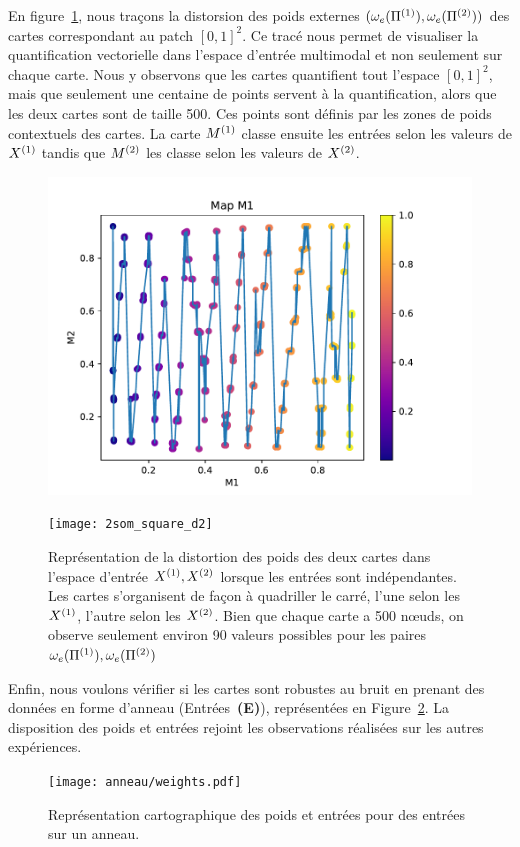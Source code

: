 \documentclass[../main]{subfiles}
\begin{document}
En figure~\ref{fig:2som_p_d}, nous traçons la distorsion des poids externes $(\omega_e(\Pi^{({1})}), \omega_e(\Pi^{({2})}))$ des cartes correspondant au patch $[0,1]^2$. Ce tracé nous permet de visualiser la quantification vectorielle dans l'espace d'entrée multimodal et non seulement sur chaque carte. 
Nous y observons que les cartes quantifient tout l'espace $[0,1]^2$, mais que seulement une centaine de points servent à la quantification, alors que les deux cartes sont de taille 500. Ces points sont définis par les zones de poids contextuels des cartes. La carte $M^{({1})}$ classe ensuite les entrées selon les valeurs de $X^{({1})}$ tandis que $M^{({2})}$ les classe selon les valeurs de $X^{({2})}$. 
\begin{figure}[t]
	\begin{minipage}{0.48\textwidth}
		\includegraphics[width=\textwidth]{2som_square_d}
	\end{minipage}
	\begin{minipage}{0.48\textwidth}
		\texttt{[image: 2som\_square\_d2]}
	\end{minipage}
	\caption{Représentation de la distortion des poids des deux cartes dans l'espace d'entrée $X^{({1})}, X^{({2})}$ lorsque les entrées sont indépendantes. Les cartes s'organisent de façon à quadriller le carré, l'une selon les $X^{({1})}$, l'autre selon les $X^{({2})}$. Bien que chaque carte a 500 n\oe{}uds, on observe seulement environ 90 valeurs possibles pour les paires $\omega_e(\Pi^{({1})}),\omega_e(\Pi^{({2})})$ \label{fig:2som_p_d}}
\end{figure}

Enfin, nous voulons vérifier si les cartes sont robustes au bruit en prenant des données en forme d'anneau (Entrées~\textbf{(E)}), représentées en Figure~\ref{fig:anneau_w}. La disposition des poids et entrées rejoint les observations réalisées sur les autres expériences.
\begin{figure}[H]
	\centering\texttt{[image: anneau/weights.pdf]}
	\caption{Représentation cartographique des poids et entrées pour des entrées sur un anneau. \label{fig:anneau_w}}
\end{figure}
\end{document}
